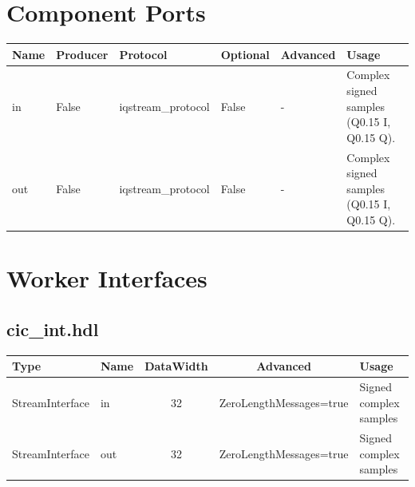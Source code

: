 \documentclass{article}
\def\comp{cic\_int}
\begin{document}
\begin{landscape}
	\section*{Component Ports}
	\begin{scriptsize}
		\begin{tabular}{|p{2cm}|p{1.5cm}|p{4cm}|p{1.5cm}|p{1.5cm}|p{10.75cm}|}
			\hline
			\rowcolor{blue}
			Name & Producer & Protocol           & Optional & Advanced & Usage                  \\
			\hline
			in   & False    & iqstream\_protocol & False     & -        & Complex signed samples (Q0.15 I, Q0.15 Q). \\
			\hline
			out  & False    & iqstream\_protocol & False     & -        & Complex signed samples (Q0.15 I, Q0.15 Q). \\
			\hline
		\end{tabular}
	\end{scriptsize}

	\section*{Worker Interfaces}
	\subsection*{\comp.hdl}
	\begin{scriptsize}
		\begin{tabular}{|M{2cm}|M{1.5cm}|c|c|M{12cm}|}
			\hline
			\rowcolor{blue}
			Type            & Name & DataWidth & Advanced                & Usage                  \\
			\hline
			StreamInterface & in   & 32        & ZeroLengthMessages=true & Signed complex samples \\
			\hline
			StreamInterface & out  & 32        & ZeroLengthMessages=true & Signed complex samples \\
			\hline
		\end{tabular}
	\end{scriptsize}
\end{landscape}
\end{document}
